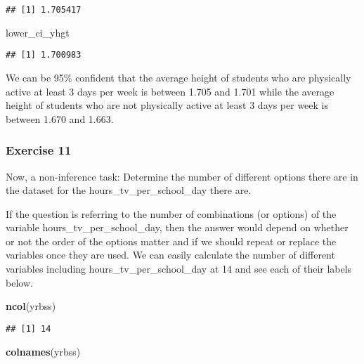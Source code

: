 \documentclass[
]{article}
\newenvironment{Shaded}{\begin{snugshade}}{\end{snugshade}}
\newcommand{\KeywordTok}[1]{\textcolor[rgb]{0.13,0.29,0.53}{\textbf{#1}}}
\newcommand{\NormalTok}[1]{#1}
\begin{document}
\begin{verbatim}
## [1] 1.705417
\end{verbatim}

\begin{Shaded}
\begin{Highlighting}[]
\NormalTok{lower_ci_yhgt }
\end{Highlighting}
\end{Shaded}

\begin{verbatim}
## [1] 1.700983
\end{verbatim}

We can be 95\% confident that the average height of students who are
physically active at least 3 days per week is between 1.705 and 1.701
while the average height of students who are not physically active at
least 3 days per week is between 1.670 and 1.663.

\hypertarget{exercise-11}{%
\subsubsection{Exercise 11}\label{exercise-11}}

Now, a non-inference task: Determine the number of different options
there are in the dataset for the hours\_tv\_per\_school\_day there are.

If the question is referring to the number of combinations (or options)
of the variable hours\_tv\_per\_school\_day, then the answer would
depend on whether or not the order of the options matter and if we
should repeat or replace the variables once they are used. We can easily
calculate the number of different variables including
hours\_tv\_per\_school\_day at 14 and see each of their labels below.

\begin{Shaded}
\begin{Highlighting}[]
\KeywordTok{ncol}\NormalTok{(yrbss)}
\end{Highlighting}
\end{Shaded}

\begin{verbatim}
## [1] 14
\end{verbatim}

\begin{Shaded}
\begin{Highlighting}[]
\KeywordTok{colnames}\NormalTok{(yrbss)}
\end{Highlighting}
\end{Shaded}
\end{document}
